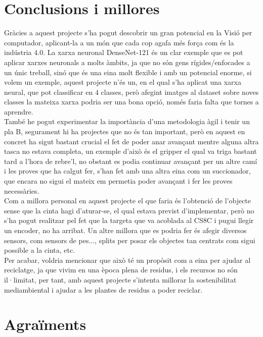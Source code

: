 ﻿\documentclass[10pt,a4paper,twocolumn,twoside]{article}
\begin{document}
\section{Conclusions i millores}

Gràcies a aquest projecte s'ha pogut descobrir un gran potencial en la Visió per computador, aplicant-la a un món que cada cop agafa més força com és la indústria 4.0. La xarxa neuronal DenseNet-121 és un clar exemple que es pot aplicar xarxes neuronals a molts àmbits, ja que no són gens rígides/enfocades a un únic treball, sinó que és una eina molt flexible i amb un potencial enorme, si volem un exemple, aquest projecte n'és un, en el qual s'ha aplicat una xarxa neural, que pot classificar en 4 classes, però afegint imatges al dataset sobre noves classes la mateixa xarxa podria ser una bona opció, només faria falta que tornes a aprendre.
\\

També he pogut experimentar la importància d'una metodologia àgil i tenir un pla B, segurament hi ha projectes que no és tan important, però en aquest en concret ha sigut bastant crucial el fet de poder anar avançant mentre alguna altra tasca no estava completa, un exemple d'això és el gripper el qual va triga bastant tard a l'hora de rebre'l, no obstant es podia continuar avançant per un altre camí i les proves que ha calgut fer, s'han fet amb una altra eina com un succionador, que encara no sigui el mateix em permetia poder avançant i fer les proves necessàries.
\\

Com a millora personal en aquest projecte el que faria és l'obtenció de l'objecte sense que la cinta hagi d'aturar-se, el qual estava previst d'implementar, però no s'ha pogut realitzar pel fet que la targeta que va acoblada al CS8C i pugui llegir un encoder, no ha arribat. Un altre millora que es podria fer és afegir diversos sensors, com sensors de pes..., splits per posar els objectes tan centrats com sigui possible a la cinta, etc.
\\

Per acabar, voldria mencionar que això té un propòsit com a eina per ajudar al reciclatge, ja que vivim en una època plena de residus, i els recursos no són il·limitat, per tant, amb aquest projecte s'intenta millorar la sostenibilitat mediambiental i ajudar a les plantes de residus a poder reciclar.

\section*{Agraïments}
\end{document}
